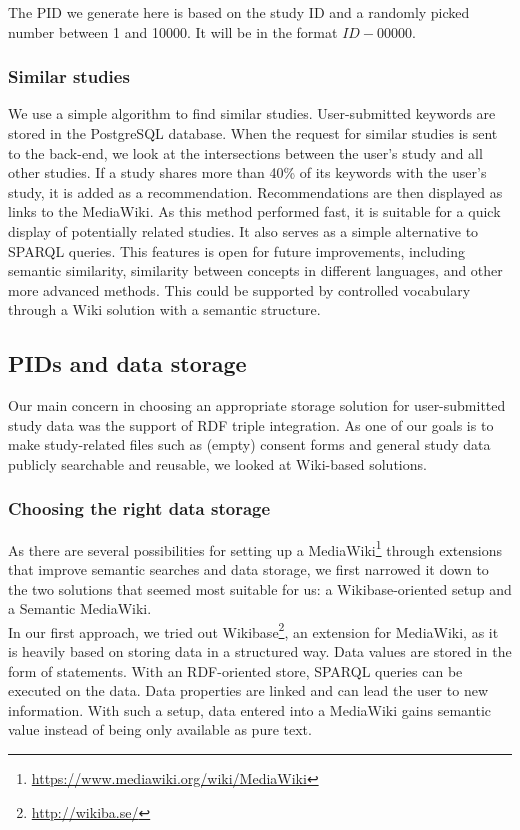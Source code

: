 \documentclass[10pt]{article}
\begin{document}
The PID we generate here is based on the study ID and a randomly picked number between 1 and 10000. It will be in the format $ID-00000$.

\subsubsection{Similar studies}
We use a simple algorithm to find similar studies. User-submitted keywords are stored in the PostgreSQL database. When the request for similar studies is sent to the back-end, we look at the intersections between the user's study and all other studies. If a study shares more than 40\% of its keywords with the user's study, it is added as a recommendation. Recommendations are then displayed as links to the MediaWiki. 
As this method performed fast, it is suitable for a quick display of potentially related studies. It also serves as a simple alternative to SPARQL queries. This features is open for future improvements, including semantic similarity, similarity between concepts in different languages, and other more advanced methods. This could be supported by controlled vocabulary through a Wiki solution with a semantic structure. 


\subsection{PIDs and data storage}
\label{sec:publicdata}
Our main concern in choosing an appropriate storage solution for user-submitted study data was the support of RDF triple integration. As one of our goals is to make study-related files such as (empty) consent forms and general study data publicly searchable and reusable, we looked at Wiki-based solutions. 

\subsubsection{Choosing the right data storage}
As there are several possibilities for setting up a MediaWiki\footnote{\url{https://www.mediawiki.org/wiki/MediaWiki}} through extensions that improve semantic searches and data storage, we first narrowed it down to the two solutions that seemed most suitable for us: 
a Wikibase-oriented setup and a Semantic MediaWiki. \\

In our first approach, we tried out Wikibase\footnote{\url{http://wikiba.se/}}, an extension for MediaWiki, as it is heavily based on storing data in a structured way. Data values are stored in the form of statements. With an RDF-oriented store, SPARQL queries can be executed on the data. Data properties are linked and can lead the user to new information. With such a setup, data entered into a MediaWiki gains semantic value instead of being only available as pure text.
\end{document}
